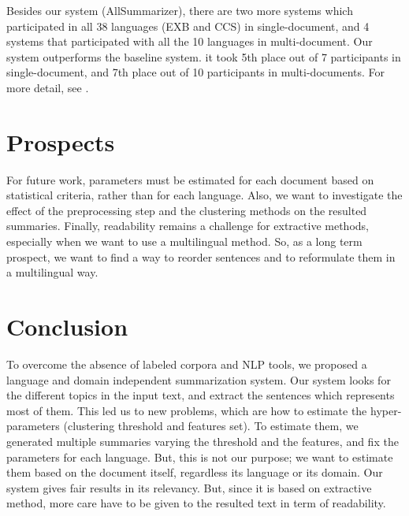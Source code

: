 \documentclass{LCSI_PhD}
\begin{document}
Besides our system (AllSummarizer), there are two more systems which participated in all 38 languages (EXB and CCS) in single-document, and 4 systems that participated with all the 10 languages in multi-document. 
Our system outperforms the baseline system. 
it took 5th place out of 7 participants in single-document, and 7th place out of 10 participants in multi-documents. 
For more detail, see \cite{15-aries-al}.

\section{Prospects}

For future work, parameters must be estimated for each document based on statistical criteria, rather than for each language.
Also, we want to investigate the effect of the preprocessing step and the clustering methods on the resulted summaries.
Finally, readability remains a challenge for extractive methods, especially when we want to use a multilingual method. 
So, as a long term prospect, we want to find a way to reorder sentences and to reformulate them in a multilingual way.

\section{Conclusion}

To overcome the absence of labeled corpora and NLP tools, we proposed a language and domain independent summarization system. 
Our system looks for the different topics in the input text, and extract the sentences which represents most of them. 
This led us to new problems, which are how to estimate the hyper-parameters (clustering threshold and features set). 
To estimate them, we generated multiple summaries varying the threshold and the features, and fix the parameters for each language. 
But, this is not our purpose; we want to estimate them based on the document itself, regardless its language or its domain. 
Our system gives fair results in its relevancy. 
But, since it is based on extractive method, more care have to be given to the resulted text in term of readability.



\end{document}
